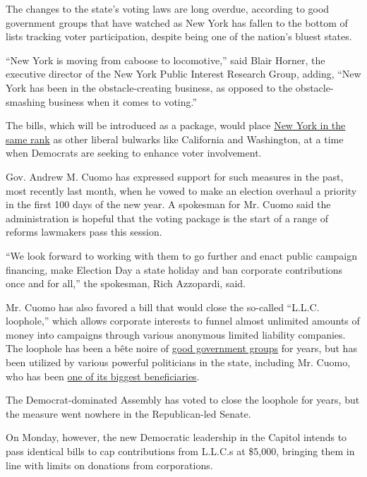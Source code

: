 The changes to the state's voting laws are long overdue, according to
good government groups that have watched as New York has fallen to the
bottom of lists tracking voter participation, despite being one of the
nation's bluest states.

``New York is moving from caboose to locomotive,'' said Blair Horner,
the executive director of the New York Public Interest Research Group,
adding, ``New York has been in the obstacle-creating business, as
opposed to the obstacle-smashing business when it comes to voting.''

The bills, which will be introduced as a package, would place
\href{http://www.ncsl.org/research/elections-and-campaigns/absentee-and-early-voting.aspx}{New
York in the same rank} as other liberal bulwarks like California and
Washington, at a time when Democrats are seeking to enhance voter
involvement.

Gov. Andrew M. Cuomo has expressed support for such measures in the
past, most recently last month, when he vowed to make an election
overhaul a priority in the first 100 days of the new year. A spokesman
for Mr. Cuomo said the administration is hopeful that the voting package
is the start of a range of reforms lawmakers pass this session.

``We look forward to working with them to go further and enact public
campaign financing, make Election Day a state holiday and ban corporate
contributions once and for all,'' the spokesman, Rich Azzopardi, said.

Mr. Cuomo has also favored a bill that would close the so-called
``L.L.C. loophole,'' which allows corporate interests to funnel almost
unlimited amounts of money into campaigns through various anonymous
limited liability companies. The loophole has been a bête noire of
\href{https://www.commoncause.org/new-york/our-work/money-influence/closing-new-yorks-llc-loophole/}{good
government groups} for years, but has been utilized by various powerful
politicians in the state, including Mr. Cuomo, who has been
\href{https://www.politico.com/states/new-york/albany/story/2018/05/06/though-he-backs-reform-cuomo-has-raised-more-from-llcs-than-every-legislator-combined-388190}{one
of its biggest beneficiaries}.

The Democrat-dominated Assembly has voted to close the loophole for
years, but the measure went nowhere in the Republican-led Senate.

On Monday, however, the new Democratic leadership in the Capitol intends
to pass identical bills to cap contributions from L.L.C.s at \$5,000,
bringing them in line with limits on donations from corporations.

